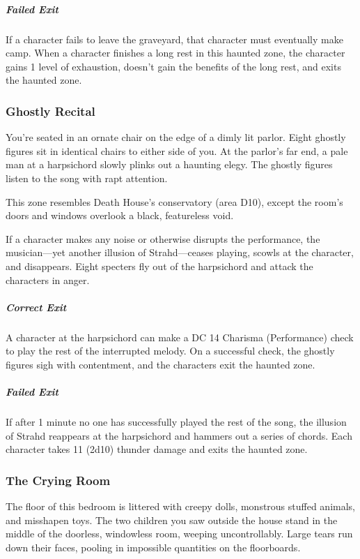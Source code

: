 \documentclass[10pt,a4paper,twoside,bg=print,twocolumn,openany,nodeprecatedcode]{dndbook}
\begin{document}
\subparagraph{Failed Exit}
If a character fails to leave the graveyard, that character must eventually make camp. When a character finishes a long rest in this haunted zone, the character gains 1 level of exhaustion, doesn't gain the benefits of the long rest, and exits the haunted zone.

\subsubsection{Ghostly Recital}
\begin{DndReadAloud}{}
You're seated in an ornate chair on the edge of a dimly lit parlor. Eight ghostly figures sit in identical chairs to either side of you. At the parlor's far end, a pale man at a harpsichord slowly plinks out a haunting elegy. The ghostly figures listen to the song with rapt attention.

\end{DndReadAloud}

This zone resembles Death House's conservatory (area D10), except the room's doors and windows overlook a black, featureless void.

If a character makes any noise or otherwise disrupts the performance, the musician—yet another illusion of Strahd—ceases playing, scowls at the character, and disappears. Eight specters fly out of the harpsichord and attack the characters in anger.

\subparagraph{Correct Exit}
A character at the harpsichord can make a DC 14 Charisma (Performance) check to play the rest of the interrupted melody. On a successful check, the ghostly figures sigh with contentment, and the characters exit the haunted zone.

\subparagraph{Failed Exit}
If after 1 minute no one has successfully played the rest of the song, the illusion of Strahd reappears at the harpsichord and hammers out a series of chords. Each character takes 11 (2d10) thunder damage and exits the haunted zone.

\subsubsection{The Crying Room}
\begin{DndReadAloud}{}
The floor of this bedroom is littered with creepy dolls, monstrous stuffed animals, and misshapen toys. The two children you saw outside the house stand in the middle of the doorless, windowless room, weeping uncontrollably. Large tears run down their faces, pooling in impossible quantities on the floorboards.

\end{DndReadAloud}
\end{document}
